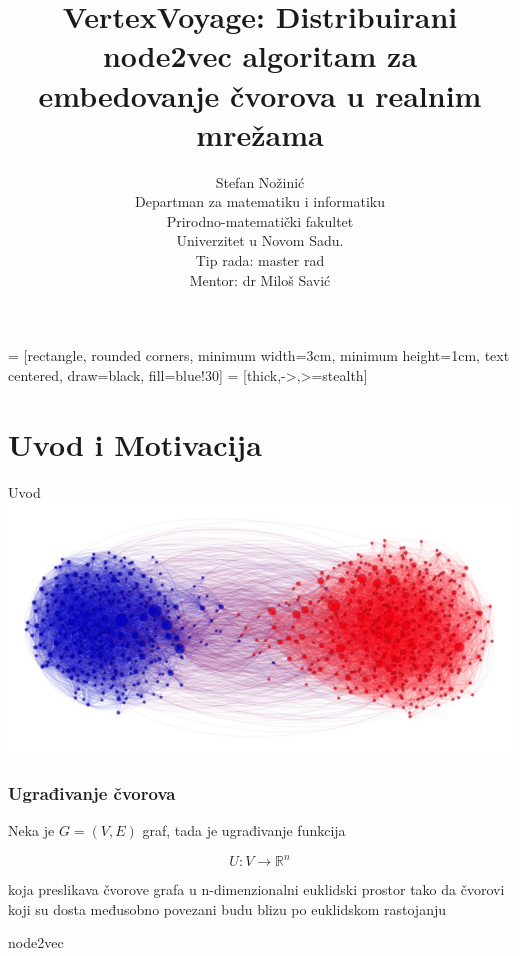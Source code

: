 \documentclass{beamer}
\begin{document}
 = [rectangle, rounded corners, minimum width=3cm, minimum height=1cm, text centered, draw=black, fill=blue!30]
 = [thick,->,>=stealth]

\title{VertexVoyage: Distribuirani node2vec algoritam za embedovanje čvorova u realnim mrežama}
\author{Stefan Nožinić \\
Departman za matematiku i informatiku \\
Prirodno-matematički fakultet \\
Univerzitet u Novom Sadu. \\
Tip rada: master rad \\
Mentor: \MakeLowercase{dr} Miloš Savić
}

\frame{
\titlepage
}

\section{Uvod i Motivacija}
\begin{frame}{Uvod}
    \includegraphics[width=\textwidth]{png/uvod.png}
\end{frame}

\begin{frame}
	\frametitle{Ugrađivanje čvorova}
	Neka je $ G = (V, E) $ graf, tada je ugrađivanje funkcija 

	$$ U : V \to \mathbb{R}^n $$ 

	koja preslikava čvorove grafa u n-dimenzionalni euklidski prostor tako da čvorovi koji su dosta međusobno povezani budu blizu po euklidskom rastojanju
	

\end{frame}

\begin{frame}{node2vec}
	\centering
\end{frame}
\end{document}
